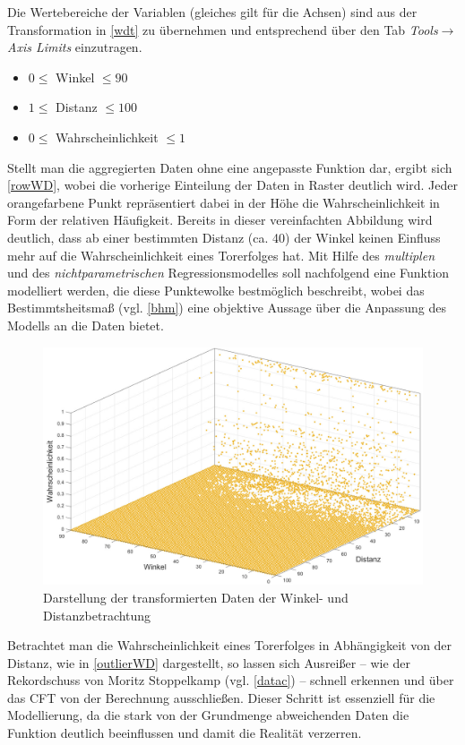 Die Wertebereiche der Variablen (gleiches gilt für die Achsen) sind aus der Transformation in \vref{wdt} zu übernehmen und entsprechend über den Tab \textit{Tools}$\rightarrow$\textit{Axis Limits} einzutragen.

\begin{itemize}
\item $ 0 \le$ Winkel $\le 90$
\item $ 1 \le$ Distanz $\le 100$
\item $ 0 \le$ Wahrscheinlichkeit $\le 1$
\end{itemize}

Stellt man die aggregierten Daten ohne eine angepasste Funktion dar, ergibt sich \vref{rowWD}, wobei die vorherige Einteilung der Daten in Raster deutlich wird. Jeder orangefarbene Punkt repräsentiert dabei in der Höhe die Wahrscheinlichkeit in Form der relativen Häufigkeit. Bereits in dieser vereinfachten Abbildung wird deutlich, dass ab einer bestimmten Distanz (ca. \textsf{40}) der Winkel keinen Einfluss mehr auf die Wahrscheinlichkeit eines Torerfolges hat. Mit Hilfe des \textit{multiplen} und des \textit{nichtparametrischen} Regressionsmodelles soll nachfolgend eine Funktion modelliert werden, die diese Punktewolke bestmöglich beschreibt, wobei das Bestimmtsheitsmaß (vgl. \vref{bhm}) eine objektive Aussage über die Anpassung des Modells an die Daten bietet.

\begin{figure}[H]
\centering
\includegraphics[scale=0.345]{se-wa-jpg/rowWD}
\caption{Darstellung der transformierten Daten der Winkel- und Distanzbetrachtung}
\label{rowWD}
\end{figure}

Betrachtet man die Wahrscheinlichkeit eines Torerfolges in Abhängigkeit von der Distanz, wie in \vref{outlierWD} dargestellt, so lassen sich Ausreißer -- wie der Rekordschuss von Moritz Stoppelkamp (vgl. \vref{datac}) -- schnell erkennen und über das CFT von der Berechnung ausschließen. Dieser Schritt ist essenziell für die Modellierung, da die stark von der Grundmenge abweichenden Daten die Funktion deutlich beeinflussen und damit die Realität verzerren.


